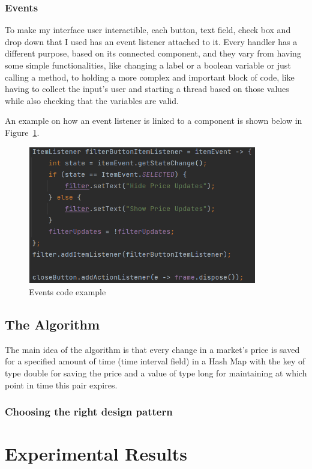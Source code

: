 \documentclass[12pt,a4paper]{report}
\begin{document}
\subsection{Events}
To make my interface user interactible, each button, text field, check box and drop down that I used has an event listener attached to it. Every handler has a different purpose, based on its connected component, and they vary from having some simple functionalities, like changing a label or a boolean variable or just calling a method, to holding a more complex and important block of code, like having to collect the input's user and starting a thread based on those values while also checking that the variables are valid.  

An example on how an event listener is linked to a component is shown below in Figure~\ref{fig:events}.

\begin{figure}[!ht]
	\centering
	\includegraphics[width=10cm,height=6cm]{pics/events.png}
	\caption{Events code example}
	\label{fig:events}
\end{figure}

\section{The Algorithm}
The main idea of the algorithm is that every change in a market's price is saved for a specified amount of time (time interval field) in a Hash Map with the key of type double for saving the price and a value of type long for maintaining at which point in time this pair expires.
\subsection{Choosing the right design pattern}

\chapter{Experimental Results}
\end{document}
